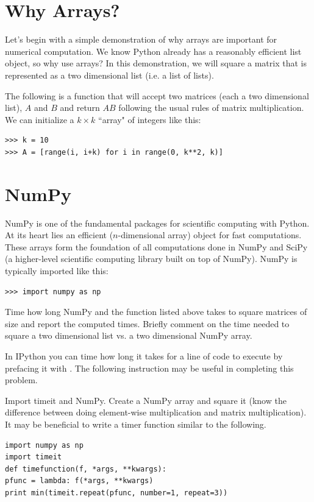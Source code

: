  
\label{lab:NumPyArrays}

\section*{Why Arrays?} Let's begin with a simple demonstration of why
arrays are important for numerical computation. We know Python already
has a reasonably efficient list object, so why use arrays? In this
demonstration, we will square a matrix that is represented as a two
dimensional list (i.e. a list of lists).

The following is a function that will accept two matrices (each a two
dimensional list), $A$ and $B$ and return $AB$ following the usual rules
of matrix multiplication. 
We can initialize a $k \times k$ ``array" of integers like this:
\begin{lstlisting}
>>> k = 10 
>>> A = [range(i, i+k) for i in range(0, k**2, k)]
\end{lstlisting}

\section*{NumPy} NumPy is one of the fundamental packages for scientific
computing with Python. At its heart lies an efficient 
($n$-dimensional array) object for fast computations. These arrays form
the foundation of all computations done in NumPy and SciPy (a
higher-level scientific computing library built on top of NumPy). NumPy
is typically imported like this: \begin{lstlisting}
>>> import numpy as np
\end{lstlisting}

\begin{problem} Time how long NumPy and the
 function listed above takes to square matrices of size
 and report the computed times. Briefly comment on
the time needed to square a two dimensional list vs. a two dimensional
NumPy array.

In IPython you can time how long it takes for a line of code to execute
by prefacing it with . The following instruction may be
useful in completing this problem.

Import timeit and NumPy. Create a NumPy array and square it 
(know the difference between doing element-wise multiplication 
and matrix multiplication).
It may be beneficial to write a timer function similar to the following.
\begin{lstlisting} 
import numpy as np
import timeit 
def timefunction(f, *args, **kwargs):
pfunc = lambda: f(*args, **kwargs) 
print min(timeit.repeat(pfunc, number=1, repeat=3)) 
\end{lstlisting} 
\end{problem}

